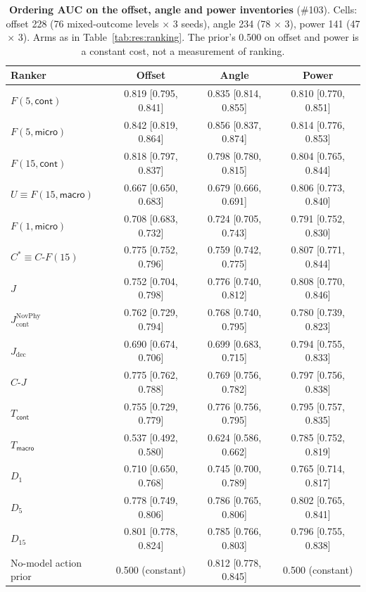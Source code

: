 \begin{table}[h]
\begin{revblock}
\centering
\footnotesize
\caption{\textbf{Ordering AUC on the offset, angle and power inventories} (\#103). Cells: offset 228 (76 mixed-outcome levels $\times$ 3 seeds), angle 234 (78 $\times$ 3), power 141 (47 $\times$ 3). Arms as in Table~\ref{tab:res:ranking}. The prior's 0.500 on offset and power is a constant cost, not a measurement of ranking.}
\label{tab:app:res:inventories}
\begin{tabular}{@{}lccc@{}}
\toprule
Ranker & Offset & Angle & Power \\
\midrule
$F(5,\textsf{cont})$ & 0.819 [0.795, 0.841] & 0.835 [0.814, 0.855] & 0.810 [0.770, 0.851] \\
$F(5,\textsf{micro})$ & 0.842 [0.819, 0.864] & 0.856 [0.837, 0.874] & 0.814 [0.776, 0.853] \\
$F(15,\textsf{cont})$ & 0.818 [0.797, 0.837] & 0.798 [0.780, 0.815] & 0.804 [0.765, 0.844] \\
$U\equiv F(15,\textsf{macro})$ & 0.667 [0.650, 0.683] & 0.679 [0.666, 0.691] & 0.806 [0.773, 0.840] \\
$F(1,\textsf{micro})$ & 0.708 [0.683, 0.732] & 0.724 [0.705, 0.743] & 0.791 [0.752, 0.830] \\
$C^{*}\equiv C\text{-}F(15)$ & 0.775 [0.752, 0.796] & 0.759 [0.742, 0.775] & 0.807 [0.771, 0.844] \\
$J$ & 0.752 [0.704, 0.798] & 0.776 [0.740, 0.812] & 0.808 [0.770, 0.846] \\
$J_{\mathrm{cont}}^{\mathrm{NovPhy}}$ & 0.762 [0.729, 0.794] & 0.768 [0.740, 0.795] & 0.780 [0.739, 0.823] \\
$J_{\mathrm{dec}}$ & 0.690 [0.674, 0.706] & 0.699 [0.683, 0.715] & 0.794 [0.755, 0.833] \\
$C\text{-}J$ & 0.775 [0.762, 0.788] & 0.769 [0.756, 0.782] & 0.797 [0.756, 0.838] \\
$T_{\textsf{cont}}$ & 0.755 [0.729, 0.779] & 0.776 [0.756, 0.795] & 0.795 [0.757, 0.835] \\
$T_{\textsf{macro}}$ & 0.537 [0.492, 0.580] & 0.624 [0.586, 0.662] & 0.785 [0.752, 0.819] \\
$D_{1}$ & 0.710 [0.650, 0.768] & 0.745 [0.700, 0.789] & 0.765 [0.714, 0.817] \\
$D_{5}$ & 0.778 [0.749, 0.806] & 0.786 [0.765, 0.806] & 0.802 [0.765, 0.841] \\
$D_{15}$ & 0.801 [0.778, 0.824] & 0.785 [0.766, 0.803] & 0.796 [0.755, 0.838] \\
No-model action prior & 0.500 (constant) & 0.812 [0.778, 0.845] & 0.500 (constant) \\
\bottomrule
\end{tabular}
\end{revblock}
\end{table}

